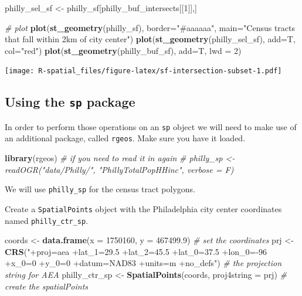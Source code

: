 \documentclass[]{book}
\newenvironment{Shaded}{\begin{snugshade}}{\end{snugshade}}
\newcommand{\KeywordTok}[1]{\textcolor[rgb]{0.13,0.29,0.53}{\textbf{#1}}}
\newcommand{\DataTypeTok}[1]{\textcolor[rgb]{0.13,0.29,0.53}{#1}}
\newcommand{\DecValTok}[1]{\textcolor[rgb]{0.00,0.00,0.81}{#1}}
\newcommand{\FloatTok}[1]{\textcolor[rgb]{0.00,0.00,0.81}{#1}}
\newcommand{\StringTok}[1]{\textcolor[rgb]{0.31,0.60,0.02}{#1}}
\newcommand{\CommentTok}[1]{\textcolor[rgb]{0.56,0.35,0.01}{\textit{#1}}}
\newcommand{\NormalTok}[1]{#1}
\begin{document}
\begin{Shaded}
\begin{Highlighting}[]
\NormalTok{philly_sel_sf <-}\StringTok{ }\NormalTok{philly_sf[philly_buf_intersects[[}\DecValTok{1}\NormalTok{]],]}

\CommentTok{# plot}
\KeywordTok{plot}\NormalTok{(}\KeywordTok{st_geometry}\NormalTok{(philly_sf), }\DataTypeTok{border=}\StringTok{"#aaaaaa"}\NormalTok{, }\DataTypeTok{main=}\StringTok{"Census tracts that fall within 2km of city center"}\NormalTok{)}
\KeywordTok{plot}\NormalTok{(}\KeywordTok{st_geometry}\NormalTok{(philly_sel_sf), }\DataTypeTok{add=}\NormalTok{T, }\DataTypeTok{col=}\StringTok{"red"}\NormalTok{)}
\KeywordTok{plot}\NormalTok{(}\KeywordTok{st_geometry}\NormalTok{(philly_buf_sf), }\DataTypeTok{add=}\NormalTok{T, }\DataTypeTok{lwd =} \DecValTok{2}\NormalTok{)}
\end{Highlighting}
\end{Shaded}

\texttt{[image: R-spatial\_files/figure-latex/sf-intersection-subset-1.pdf]}

\subsection{\texorpdfstring{Using the \texttt{sp}
package}{Using the sp package}}\label{using-the-sp-package}

In order to perform those operations on an \texttt{sp} object we will
need to make use of an additional package, called \texttt{rgeos}. Make
sure you have it loaded.

\begin{Shaded}
\begin{Highlighting}[]
\KeywordTok{library}\NormalTok{(rgeos)}
\CommentTok{# if you need to read it in again}
\CommentTok{# philly_sp <- readOGR("data/Philly/", "PhillyTotalPopHHinc", verbose = F)}
\end{Highlighting}
\end{Shaded}

We will use \texttt{philly\_sp} for the census tract polygons.

Create a \texttt{SpatialPoints} object with the Philadelphia city center
coordinates named \texttt{philly\_ctr\_sp}.

\begin{Shaded}
\begin{Highlighting}[]
\NormalTok{coords <-}\StringTok{ }\KeywordTok{data.frame}\NormalTok{(}\DataTypeTok{x =} \DecValTok{1750160}\NormalTok{, }\DataTypeTok{y =} \FloatTok{467499.9}\NormalTok{) }\CommentTok{# set the coordinates}
\NormalTok{prj <-}\StringTok{ }\KeywordTok{CRS}\NormalTok{(}\StringTok{"+proj=aea +lat_1=29.5 +lat_2=45.5 +lat_0=37.5 +lon_0=-96 +x_0=0 +y_0=0 +datum=NAD83 +units=m +no_defs"}\NormalTok{) }\CommentTok{# the projection string for AEA}
\NormalTok{philly_ctr_sp <-}\StringTok{ }\KeywordTok{SpatialPoints}\NormalTok{(coords, }\DataTypeTok{proj4string =}\NormalTok{ prj) }\CommentTok{# create the spatialPoints}
\end{Highlighting}
\end{Shaded}
\end{document}
